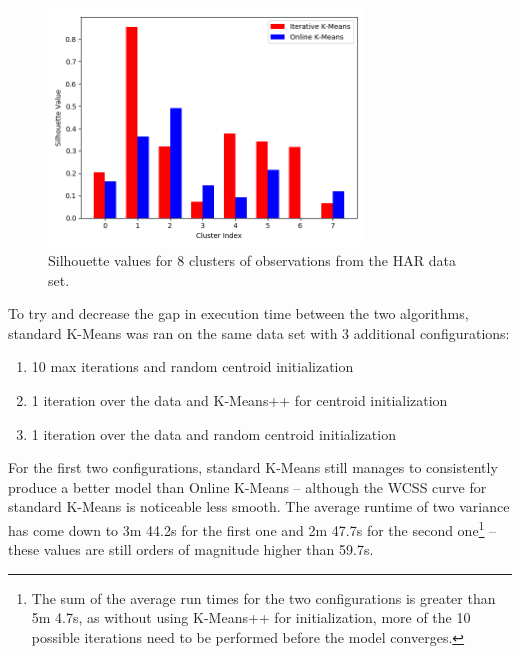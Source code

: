 \documentclass{l4proj}
\begin{document}
\begin{figure}[H]
	\centering
    \label{fig:res19}
    \includegraphics[width=0.75\textwidth]{images/result19}
    \caption{Silhouette values for 8 clusters of observations from the HAR data set.} 
\end{figure}

To try and decrease the gap in execution time between the two algorithms, standard K-Means was ran on the same data set with 3 additional configurations:

\begin{enumerate}
\item 10 max iterations and random centroid initialization
\item 1 iteration over the data and K-Means++ for centroid initialization
\item 1 iteration over the data and random centroid initialization
\end{enumerate}


For the first two configurations, standard K-Means still manages to consistently produce a better model than Online K-Means -- although the WCSS curve for standard K-Means is noticeable less smooth. The average runtime of two variance has come down to  3m 44.2s for the first one and 2m 47.7s for the second one\footnote{The sum of the average run times for the two configurations is greater than 5m 4.7s, as without using K-Means++ for initialization, more of the 10 possible iterations need to be performed before the model converges.} -- these values are still orders of magnitude higher than 59.7s.
\end{document}
